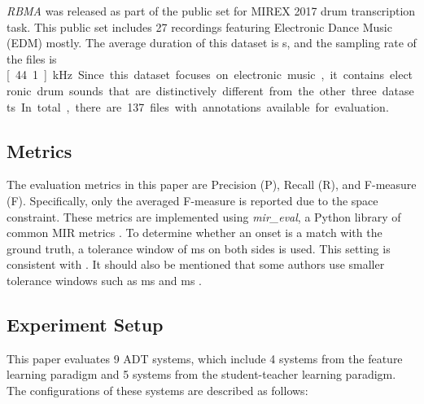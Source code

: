 \documentclass{article}
\begin{document}
\textit{RBMA} \cite{Vogl2017_ismir} was released as part of the public set for MIREX 2017 drum transcription task. This public set includes 27 recordings featuring Electronic Dance Music (EDM) mostly. The average duration of this dataset is \unit[230]{s}, and the sampling rate of the files is \unit[44.1]{kHz}. Since this dataset focuses on electronic music, it contains electronic drum sounds that are distinctively different from the other three datasets. 

In total, there are 137 files with annotations available for evaluation. 

\subsection{Metrics}
The evaluation metrics in this paper are Precision (P), Recall (R), and F-measure (F). Specifically, only the averaged F-measure is reported due to the space constraint. These metrics are implemented using \textit{mir\_eval}, a Python library of common MIR metrics \cite{Raffel2014}. 
To determine whether an onset is a match with the ground truth, a tolerance window of \unit[50]{ms} on both sides is used. This setting is consistent with \cite{Gillet2008_taslp, Wu2015_ismir, Southall2016}. It should also be mentioned that some authors use smaller tolerance windows such as \unit[30]{ms} \cite{PaulusK09_DrumTransHMM_JASMP} and \unit[20]{ms} \cite{Vogl2017_icassp}.

\subsection{Experiment Setup}
This paper evaluates 9 ADT systems, which include 4 systems from the feature learning paradigm and 5 systems from the student-teacher learning paradigm. The configurations of these systems are described as follows:
\end{document}
